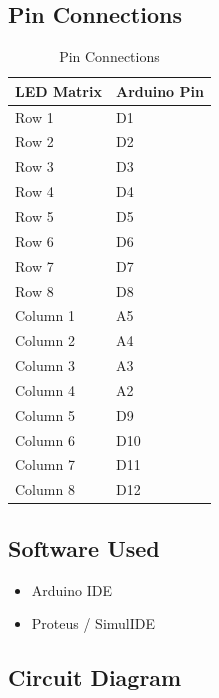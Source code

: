 
\subsection{Pin Connections}

\begin{table}[H]
\centering
\caption{Pin Connections}
\begin{tabular}{|l|l|}
\hline
\textbf{LED Matrix} & \textbf{Arduino Pin} \\
\hline
Row 1 & D1 \\
Row 2 & D2 \\
Row 3 & D3 \\
Row 4 & D4 \\
Row 5 & D5 \\
Row 6 & D6 \\
Row 7 & D7 \\
Row 8 & D8 \\
Column 1 & A5 \\
Column 2 & A4 \\
Column 3 & A3 \\
Column 4 & A2 \\
Column 5 & D9 \\
Column 6 & D10 \\
Column 7 & D11 \\
Column 8 & D12 \\
\hline
\end{tabular}
\end{table}


\subsection{Software Used}

\begin{itemize}
    \item Arduino IDE
    \item Proteus / SimulIDE
\end{itemize}


\subsection{Circuit Diagram}

